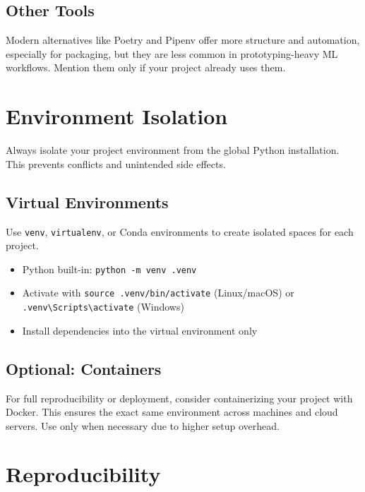 \documentclass[12pt,openany]{book}
\begin{document}
\subsection{Other Tools}

Modern alternatives like Poetry and Pipenv offer more structure and automation, especially for packaging, but they are less common in prototyping-heavy ML workflows. Mention them only if your project already uses them.



\section{Environment Isolation}

Always isolate your project environment from the global Python installation. This prevents conflicts and unintended side effects.

\subsection{Virtual Environments}

Use \texttt{venv}, \texttt{virtualenv}, or Conda environments to create isolated spaces for each project.

\begin{itemize}
    \item Python built-in: \texttt{python -m venv .venv}
    \item Activate with \texttt{source .venv/bin/activate} (Linux/macOS) or \texttt{.venv\textbackslash Scripts\textbackslash activate} (Windows)
    \item Install dependencies into the virtual environment only
\end{itemize}


\subsection{Optional: Containers}

For full reproducibility or deployment, consider containerizing your project with Docker. This ensures the exact same environment across machines and cloud servers. Use only when necessary due to higher setup overhead.



\section{Reproducibility}
\end{document}
